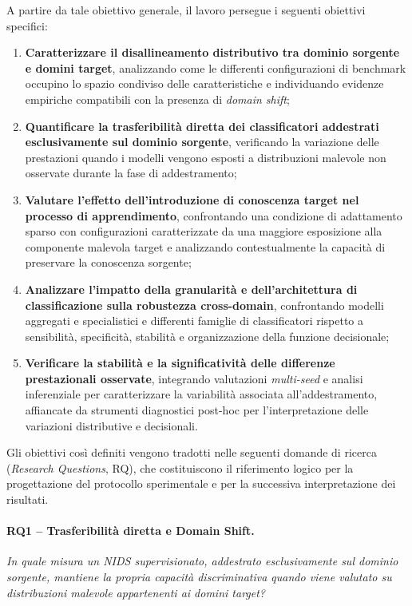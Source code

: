 A partire da tale obiettivo generale, il lavoro persegue i seguenti obiettivi specifici:
\begin{enumerate}
    \item \textbf{Caratterizzare il disallineamento distributivo tra dominio sorgente e domini target}, analizzando come le differenti configurazioni di benchmark occupino lo spazio condiviso delle caratteristiche e individuando evidenze empiriche compatibili con la presenza di \textit{domain shift};

    \item \textbf{Quantificare la trasferibilità diretta dei classificatori addestrati esclusivamente sul dominio sorgente}, verificando la variazione delle prestazioni quando i modelli vengono esposti a distribuzioni malevole non osservate durante la fase di addestramento;

    \item \textbf{Valutare l'effetto dell'introduzione di conoscenza target nel processo di apprendimento}, confrontando una condizione di adattamento sparso con configurazioni caratterizzate da una maggiore esposizione alla componente malevola target e analizzando contestualmente la capacità di preservare la conoscenza sorgente;

    \item \textbf{Analizzare l'impatto della granularità e dell'architettura di classificazione sulla robustezza cross-domain}, confrontando modelli aggregati e specialistici e differenti famiglie di classificatori rispetto a sensibilità, specificità, stabilità e organizzazione della funzione decisionale;

    \item \textbf{Verificare la stabilità e la significatività delle differenze prestazionali osservate}, integrando valutazioni \textit{multi-seed} e analisi inferenziale per caratterizzare la variabilità associata all'addestramento, affiancate da strumenti diagnostici post-hoc per l'interpretazione delle variazioni distributive e decisionali.
\end{enumerate}

Gli obiettivi così definiti vengono tradotti nelle seguenti domande di ricerca (\textit{Research Questions}, RQ), che costituiscono il riferimento logico per la progettazione del protocollo sperimentale e per la successiva interpretazione dei risultati.

\paragraph{RQ1 -- Trasferibilità diretta e Domain Shift.}
\textit{In quale misura un NIDS supervisionato, addestrato esclusivamente sul dominio sorgente, mantiene la propria capacità discriminativa quando viene valutato su distribuzioni malevole appartenenti ai domini target?}

